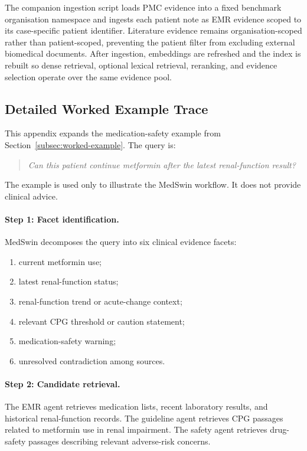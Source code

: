 \documentclass[conference]{IEEEtran}
\begin{document}
The companion ingestion script loads PMC evidence into a fixed benchmark organisation namespace and ingests each patient note as EMR evidence scoped to its case-specific patient identifier. Literature evidence remains organisation-scoped rather than patient-scoped, preventing the patient filter from excluding external biomedical documents. After ingestion, embeddings are refreshed and the index is rebuilt so dense retrieval, optional lexical retrieval, reranking, and evidence selection operate over the same evidence pool.


\subsection{Detailed Worked Example Trace}
\label{app:worked-example-trace}

This appendix expands the medication-safety example from Section~\ref{subsec:worked-example}. The query is:

\begin{quote}
\emph{Can this patient continue metformin after the latest renal-function result?}
\end{quote}

The example is used only to illustrate the MedSwin workflow. It does not provide clinical advice.

\paragraph{Step 1: Facet identification.}
MedSwin decomposes the query into six clinical evidence facets:
\begin{enumerate}
    \item current metformin use;
    \item latest renal-function status;
    \item renal-function trend or acute-change context;
    \item relevant CPG threshold or caution statement;
    \item medication-safety warning;
    \item unresolved contradiction among sources.
\end{enumerate}

\paragraph{Step 2: Candidate retrieval.}
The EMR agent retrieves medication lists, recent laboratory results, and historical renal-function records. The guideline agent retrieves CPG passages related to metformin use in renal impairment. The safety agent retrieves drug-safety passages describing relevant adverse-risk concerns.
\end{document}
